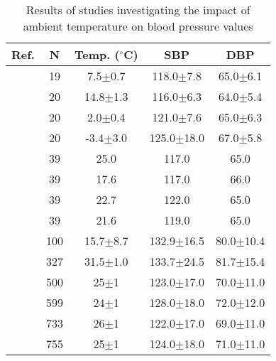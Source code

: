 \documentclass[journal,article,moreauthors]{Definitions/mdpi}
\begin{document}
\begin{table}[tb]
\caption{Results of studies investigating the impact of ambient temperature on blood pressure values}\label{Tab: TEM}
\begin{center}
\begin{tabular}{rcccc}
\toprule
\textbf{Ref.} & \textbf{N} & \textbf{Temp. ($^{\circ}$C)} &\textbf{SBP} &\textbf{DBP} \\ 
\hline
\citep{Jansen2001-xl} & 19 & 7.5$\pm$0.7 &118.0$\pm$7.8 & 65.0$\pm$6.1 \\ 
\hline
\citep{Jansen2001-xl} & 20 & 14.8$\pm$1.3 & 116.0$\pm$6.3 & 64.0$\pm$5.4 \\  
\hline
\citep{Jansen2001-xl} & 20 & 2.0$\pm$0.4& 121.0$\pm$7.6 &  65.0$\pm$6.3 \\  
\hline
\citep{Jansen2001-xl} & 20 & -3.4$\pm$3.0& 125.0$\pm$18.0 &  67.0$\pm$5.8 \\ 
\hline
\citep{Wu2015-dj} & 39 & 25.0 &117.0&65.0 \\  
\hline
\citep{Wu2015-dj} & 39 & 17.6 & 117.0& 66.0 \\  
\hline
\citep{Wu2015-dj} & 39 & 22.7 & 122.0& 65.0 \\  
\hline
\citep{Wu2015-dj} & 39 & 21.6 & 119.0& 65.0 \\
\hline
\citep{Xu2019-rx} & 100 & 15.7$\pm$8.7 &132.9$\pm$16.5 &80.0$\pm$10.4 \\ 
\hline
\citep{Kim2012-oi} & 327 & 31.5$\pm$1.0 &133.7$\pm$24.5 &81.7$\pm$15.4 \\
\hline
\citep{Widlansky2007-ih} & 500 & 25$\pm$1 &123.0$\pm$17.0 & 70.0$\pm$11.0 \\
\hline
\citep{Widlansky2007-ih} & 599 & 24$\pm$1 &128.0$\pm$18.0 & 72.0$\pm$12.0 \\  
\hline
\citep{Widlansky2007-ih} & 733 & 26$\pm$1 &122.0$\pm$17.0 & 69.0$\pm$11.0 \\  
\hline
\citep{Widlansky2007-ih} & 755 & 25$\pm$1 &124.0$\pm$18.0 & 71.0$\pm$11.0 \\  
\bottomrule
\end{tabular}
\end{center}
\end{table}

\end{document}
